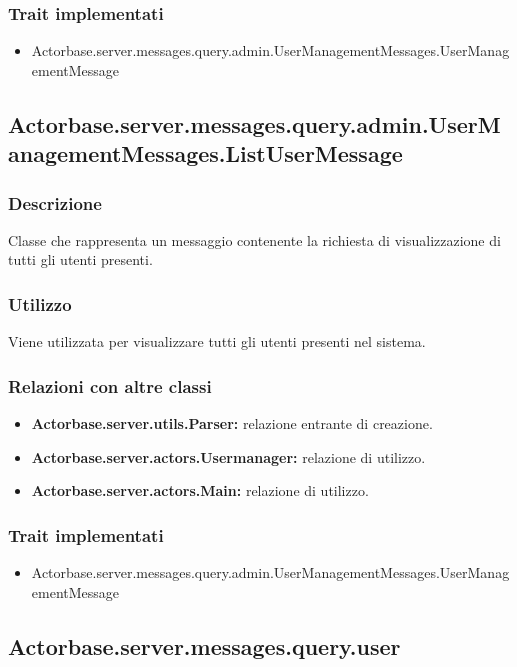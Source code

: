 \documentclass[a4paper]{article}
\begin{document}
			\subsubsection{Trait implementati}
				\begin{itemize}
					\item Actorbase.server.messages.query.admin.UserManagementMessages.UserManagementMessage
				\end{itemize}
				
		\subsection{Actorbase.server.messages.query.admin.UserManagementMessages.ListUserMessage}
			\subsubsection{Descrizione}
				Classe che rappresenta un messaggio contenente la richiesta di visualizzazione di tutti gli utenti presenti.
				
			\subsubsection{Utilizzo}
				Viene utilizzata per visualizzare tutti gli utenti presenti nel sistema.
				
			\subsubsection{Relazioni con altre classi}
				\begin{itemize}
					\item \textbf{Actorbase.server.utils.Parser:} relazione entrante di creazione.
					\item \textbf{Actorbase.server.actors.Usermanager:} relazione di utilizzo.
					\item \textbf{Actorbase.server.actors.Main:} relazione di utilizzo.
				\end{itemize}
			\subsubsection{Trait implementati}
				\begin{itemize}
					\item Actorbase.server.messages.query.admin.UserManagementMessages.UserManagementMessage
				\end{itemize}
			
		\subsection{Actorbase.server.messages.query.user}
		
\end{document}

